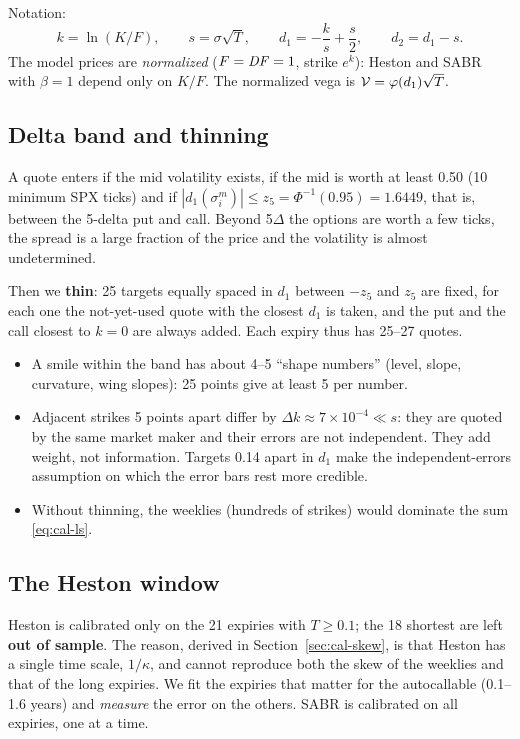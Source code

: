 Notation:
\[
k=\ln(K/F),\qquad s=\sigma\sqrt T,\qquad d_1=-\frac ks+\frac s2,\qquad d_2=d_1-s .
\]
The model prices are \emph{normalized} ($F=\mathit{DF}=1$, strike $e^k$): Heston and SABR with $\beta=1$ depend only on
$K/F$. The normalized vega is $\mathcal{V}=\varphi(d_1)\sqrt T$.

\subsection{Delta band and thinning}
A quote enters if the mid volatility exists, if the mid is worth at least 0.50 (10 minimum SPX ticks) and if
$|d_1(\sigma^m_i)|\le z_5=\Phi^{-1}(0.95)=1.6449$, that is, between the 5-delta put and call. Beyond 5$\Delta$ the
options are worth a few ticks, the spread is a large fraction of the price and the volatility is almost undetermined.

Then we \textbf{thin}: 25 targets equally spaced in $d_1$ between $-z_5$ and $z_5$ are fixed, for each one the
not-yet-used quote with the closest $d_1$ is taken, and the put and the call closest to $k=0$ are always added. Each
expiry thus has 25--27 quotes.

\begin{perche}[title={Why thin, and why 25}]
\begin{itemize}
\item A smile within the band has about 4--5 ``shape numbers'' (level, slope, curvature, wing slopes): 25 points give
at least 5 per number.
\item Adjacent strikes 5 points apart differ by $\Delta k\approx7\times10^{-4}\ll s$: they are quoted by the same
market maker and their errors are not independent. They add weight, not information. Targets 0.14 apart in $d_1$ make
the independent-errors assumption on which the error bars rest more credible.
\item Without thinning, the weeklies (hundreds of strikes) would dominate the sum \eqref{eq:cal-ls}.
\end{itemize}
\end{perche}

\subsection{The Heston window}
Heston is calibrated only on the 21 expiries with $T\ge0.1$; the 18 shortest are left \textbf{out of sample}. The
reason, derived in Section~\ref{sec:cal-skew}, is that Heston has a single time scale, $1/\kappa$, and cannot
reproduce both the skew of the weeklies and that of the long expiries. We fit the expiries that matter for the
autocallable (0.1--1.6 years) and \emph{measure} the error on the others. SABR is calibrated on all expiries, one at a
time.

